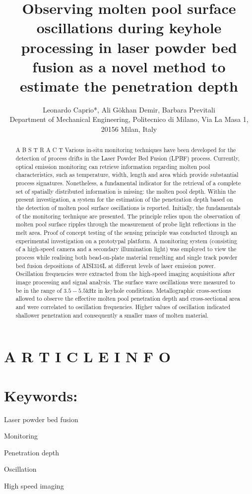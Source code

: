 \documentclass[10pt]{article}
\title{Observing molten pool surface oscillations during keyhole processing in laser powder bed fusion as a novel method to estimate the penetration depth }
\author{Leonardo Caprio*, Ali Gökhan Demir, Barbara Previtali\\
Department of Mechanical Engineering, Politecnico di Milano, Via La Masa 1, 20156 Milan, Italy}
\date{}
\begin{document}
\maketitle


\section*{A R T I C L E I N F O}
\section*{Keywords:}
Laser powder bed fusion

Monitoring

Penetration depth

Oscillation

High speed imaging

\begin{abstract}
A B S T R A C T Various in-situ monitoring techniques have been developed for the detection of process drifts in the Laser Powder Bed Fusion (LPBF) process. Currently, optical emission monitoring can retrieve information regarding molten pool characteristics, such as temperature, width, length and area which provide substantial process signatures. Nonetheless, a fundamental indicator for the retrieval of a complete set of spatially distributed information is missing: the molten pool depth. Within the present investigation, a system for the estimation of the penetration depth based on the detection of molten pool surface oscillations is reported. Initially, the fundamentals of the monitoring technique are presented. The principle relies upon the observation of molten pool surface ripples through the measurement of probe light reflections in the melt area. Proof of concept testing of the sensing principle was conducted through an experimental investigation on a prototypal platform. A monitoring system (consisting of a high-speed camera and a secondary illumination light) was employed to view the process while realising both bead-on-plate material remelting and single track powder bed fusion depositions of AISI316L at different levels of laser emission power. Oscillation frequencies were extracted from the high-speed imaging acquisitions after image processing and signal analysis. The surface wave oscillations were measured to be in the range of $3.5-5.5 \mathrm{kHz}$ in keyhole conditions. Metallographic cross-sections allowed to observe the effective molten pool penetration depth and cross-sectional area and were correlated to oscillation frequencies. Higher values of oscillation indicated shallower penetration and consequently a smaller mass of molten material.
\end{abstract}
\end{document}
